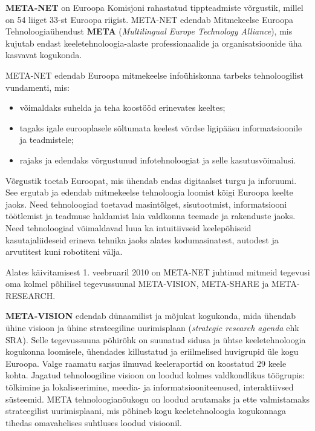 \documentclass[]{../metanetpaper}
\begin{document}
\begin{multicols}{2}

\textbf{META-NET} on Euroopa Komisjoni rahastatud tippteadmiste võrgustik, millel on 54 liiget 33-st Euroopa riigist. 
META-NET edendab Mitmekeelse Euroopa Tehnoloogiaühendust \textbf{META} (\textit{Multilingual Europe Technology Alliance}), mis kujutab endast keeletehnoloogia-alaste professionaalide ja organisatsioonide üha kasvavat kogukonda.

META-NET edendab Euroopa mitmekeelse infoühiskonna tarbeks tehnoloogilist vundamenti, mis: 
\begin{itemize}
\item võimaldaks suhelda ja teha koostööd erinevates keeltes;
\item tagaks igale eurooplasele sõltumata keelest võrdse ligipääsu informatsioonile ja teadmistele;
\item rajaks ja edendaks võrgustunud infotehnoloogiat ja selle kasutusvõimalusi.
\end{itemize}

Võrgustik toetab Euroopat, mis ühendab endas digitaalset turgu ja inforuumi. See ergutab ja edendab mitmekeelse tehnoloogia loomist kõigi Euroopa keelte jaoks. 
Need tehnoloogiad toetavad masintõlget, sisutootmist, informatsiooni töötlemist ja teadmuse haldamist laia valdkonna teemade ja rakenduste jaoks. Need tehnoloogiad võimaldavad luua ka intuitiivseid keelepõhiseid kasutajaliideseid erineva tehnika jaoks alates kodumasinatest, autodest ja arvutitest kuni robotiteni välja.


Alates käivitamisest 1. veebruaril 2010 on META-NET juhtinud mitmeid tegevusi oma kolmel põhilisel tegevussuunal META-VISION, META-SHARE ja META-RESEARCH.

\textbf{META-VISION} edendab dünaamilist ja mõjukat kogukonda, mida ühendab ühine visioon ja ühine strateegiline uurimisplaan (\textit{strategic research agenda} ehk SRA). Selle tegevussuuna põhirõhk on suunatud sidusa ja ühtse keeletehnoloogia kogukonna loomisele, ühendades killustatud ja eriilmelised huvigrupid üle kogu Euroopa. 
Valge raamatu sarjas ilmuvad keeleraportid on koostatud 29 keele kohta. 
Jagatud tehnoloogiline visioon on loodud kolmes valdkondlikus töögrupis: tõlkimine ja lokaliseerimine, meedia- ja informatsiooniteenused, interaktiivsed süsteemid. 
META tehnoloogianõukogu on loodud arutamaks ja ette valmistamaks strateegilist uurimisplaani, mis põhineb kogu keeletehnoloogia kogukonnaga tihedas omavahelises suhtluses loodud visioonil.


\end{multicols}
\end{document}
